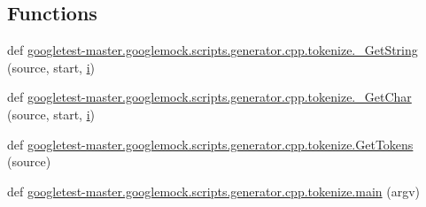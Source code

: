 \subsection*{Functions}
\begin{DoxyCompactItemize}
\item 
def \mbox{\hyperlink{namespacegoogletest-master_1_1googlemock_1_1scripts_1_1generator_1_1cpp_1_1tokenize_acfe7658c5bcf9a1cfdc58a4c6d87acf6}{googletest-\/master.\+googlemock.\+scripts.\+generator.\+cpp.\+tokenize.\+\_\+\+Get\+String}} (source, start, \mbox{\hyperlink{_obj__test_2lib_2googletest-master_2googlemock_2test_2gmock-matchers__test_8cc_acb559820d9ca11295b4500f179ef6392}{i}})
\item 
def \mbox{\hyperlink{namespacegoogletest-master_1_1googlemock_1_1scripts_1_1generator_1_1cpp_1_1tokenize_a7f0c078163faac84d75890ac4cca3517}{googletest-\/master.\+googlemock.\+scripts.\+generator.\+cpp.\+tokenize.\+\_\+\+Get\+Char}} (source, start, \mbox{\hyperlink{_obj__test_2lib_2googletest-master_2googlemock_2test_2gmock-matchers__test_8cc_acb559820d9ca11295b4500f179ef6392}{i}})
\item 
def \mbox{\hyperlink{namespacegoogletest-master_1_1googlemock_1_1scripts_1_1generator_1_1cpp_1_1tokenize_a9921eb232bd9bc73c6dffee1b856c88a}{googletest-\/master.\+googlemock.\+scripts.\+generator.\+cpp.\+tokenize.\+Get\+Tokens}} (source)
\item 
def \mbox{\hyperlink{namespacegoogletest-master_1_1googlemock_1_1scripts_1_1generator_1_1cpp_1_1tokenize_add34c8c07052cb29832e932882e79d35}{googletest-\/master.\+googlemock.\+scripts.\+generator.\+cpp.\+tokenize.\+main}} (argv)
\end{DoxyCompactItemize}
